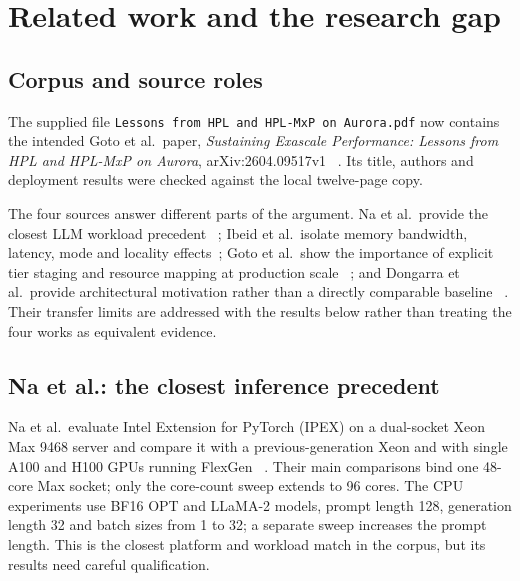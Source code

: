 
\section{Related work and the research gap}
\label{sec:related-work}

\subsection{Corpus and source roles}

The supplied file
\texttt{Lessons from HPL and HPL-MxP on Aurora.pdf} now contains the
intended Goto et al.\ paper, \emph{Sustaining Exascale Performance:
Lessons from HPL and HPL-MxP on Aurora}, arXiv:2604.09517v1
~\cite{goto2026aurorahpl}.  Its title, authors and deployment results
were checked against the local twelve-page copy.

The four sources answer different parts of the argument.  Na et
al.\ provide the closest LLM workload precedent
~\cite{na2024llmcpu}; Ibeid et al.\ isolate memory bandwidth, latency,
mode and locality effects~\cite{ibeid2025aurora}; Goto et al.\ show the
importance of explicit tier staging and resource mapping at production
scale
~\cite{goto2026aurorahpl}; and Dongarra et al.\ provide architectural
motivation rather than a directly comparable baseline
~\cite{dongarra2026gpus}.  Their transfer limits are addressed with the
results below rather than treating the four works as equivalent
evidence.

\subsection{Na et al.: the closest inference precedent}
\label{sec:na-review}

Na et al.\ evaluate Intel Extension for PyTorch (IPEX) on a dual-socket
Xeon Max 9468 server and compare it with a previous-generation Xeon and
with single A100 and H100 GPUs running FlexGen
~\cite{na2024llmcpu}.  Their main comparisons bind one 48-core Max
socket; only the core-count sweep extends to 96 cores.  The CPU
experiments use BF16 OPT and LLaMA-2 models, prompt length 128,
generation length 32 and batch sizes from 1 to 32; a separate sweep
increases the prompt length.  This is the closest platform and workload
match in the corpus, but its results need careful qualification.

